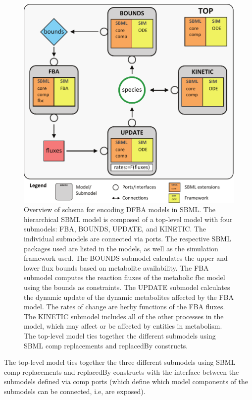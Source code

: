 \documentclass{bioinfo}
\begin{document}
\begin{figure}[!t]
\centerline{\includegraphics[width=\linewidth]{figures/Fig2_dfba_schema.pdf}}
	\caption{Overview of schema for encoding DFBA models in SBML. The hierarchical SBML model is composed of a top-level model with four submodels: FBA, BOUNDS, UPDATE, and KINETIC. The individual submodels are connected via ports. The respective SBML packages used are listed in the models, as well as the simulation framework used. The BOUNDS submodel calculates the upper and lower flux bounds based on metabolite availability. The FBA submodel computes the reaction fluxes of the metabolic fbc model using the bounds as constraints. The UPDATE submodel calculates the dynamic update of the dynamic metabolites affected by the FBA model. The rates of change are herby functions of the FBA fluxes. The KINETIC submodel includes all of the other processes in the model, which may affect or be affected by entities in metabolism. The top-level model ties together the different submodels using SBML comp replacements and replacedBy constructs.}\label{fig:schema}
\end{figure}

The top-level model ties together the three different submodels using SBML comp replacements and replacedBy constructs with the interface between the submodels defined via comp ports (which define which model components of the submodels can be connected, i.e, are exposed).
 
\end{document}
